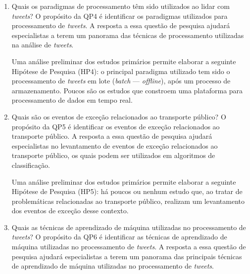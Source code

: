 \documentclass[
	12pt,				%
	oneside,			%
	a4paper,			%
	english,			%
	brazil				%
	]{abntex2ppgsi}
\begin{document}
{{\begin{enumerate}
Uma análise preliminar dos estudos primários permite elaborar a seguinte Hipótese de Pesquisa (HP3): \textit{${F_1}$ score} é a principal técnica utilizada para validação de classificação binária.\newline

\item Quais os paradigmas de processamento têm sido utilizados ao lidar com \textit{tweets}?
\label{item:4} \newline \newline
O propósito da QP4 é identificar os paradigmas utilizados para processamento de \textit{tweets}. A resposta a essa questão de pesquisa ajudará especialistas a terem um panorama das técnicas de processamento utilizadas na análise de \textit{tweets}. \newline

Uma análise preliminar dos estudos primários permite elaborar a seguinte Hipótese de Pesquisa (HP4): o principal paradigma utilizado tem sido o processamento de \textit{tweets} em lote (\textit{batch} --- \textit{offline}), após um processo de armazenamento. Poucos são os estudos que constroem uma plataforma para processamento de dados em tempo real. \newline

\item Quais são os eventos de exceção relacionados ao transporte público?
\label{item:5} \newline \newline
O propósito da QP5 é identificar os eventos de exceção relacionados ao transporte público. A resposta a essa questão de pesquisa ajudará especialistas no levantamento de eventos de exceção relacionados ao transporte público, os quais podem ser utilizados em algoritmos de classificação.\newline

Uma análise preliminar dos estudos primários permite elaborar a seguinte Hipótese de Pesquisa (HP5): há poucos ou nenhum estudo que, ao tratar de problemáticas relacionadas ao transporte público, realizam um levantamento dos eventos de exceção desse contexto.\newline

\item Quais as técnicas de aprendizado de máquina utilizadas no processamento de \textit{tweets}?
\label{item:6} \newline \newline
O propósito da QP6 é identificar as técnicas de aprendizado de máquina utilizadas no processamento de \textit{tweets}. A resposta a essa questão de pesquisa ajudará especialistas a terem um panorama das principais técnicas de aprendizado de máquina utilizadas no processamento de \textit{tweets}. \newline


\end{enumerate}}}
\end{document}
